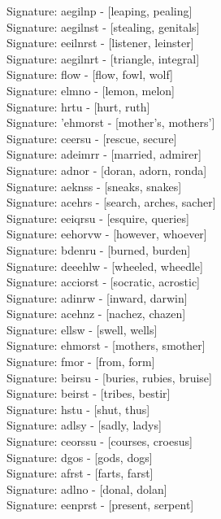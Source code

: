 Signature: {aegilnp} - [leaping, pealing] \\
Signature: {aegilnst} - [stealing, genitals] \\
Signature: {eeilnrst} - [listener, leinster] \\
Signature: {aegilnrt} - [triangle, integral] \\
Signature: {flow} - [flow, fowl, wolf] \\
Signature: {elmno} - [lemon, melon] \\
Signature: {hrtu} - [hurt, ruth] \\
Signature: {'ehmorst} - [mother's, mothers'] \\
Signature: {ceersu} - [rescue, secure] \\
Signature: {adeimrr} - [married, admirer] \\
Signature: {adnor} - [doran, adorn, ronda] \\
Signature: {aeknss} - [sneaks, snakes] \\
Signature: {acehrs} - [search, arches, sacher] \\
Signature: {eeiqrsu} - [esquire, queries] \\
Signature: {eehorvw} - [however, whoever] \\
Signature: {bdenru} - [burned, burden] \\
Signature: {deeehlw} - [wheeled, wheedle] \\
Signature: {acciorst} - [socratic, acrostic] \\
Signature: {adinrw} - [inward, darwin] \\
Signature: {acehnz} - [nachez, chazen] \\
Signature: {ellsw} - [swell, wells] \\
Signature: {ehmorst} - [mothers, smother] \\
Signature: {fmor} - [from, form] \\
Signature: {beirsu} - [buries, rubies, bruise] \\
Signature: {beirst} - [tribes, bestir] \\
Signature: {hstu} - [shut, thus] \\
Signature: {adlsy} - [sadly, ladys] \\
Signature: {ceorssu} - [courses, croesus] \\
Signature: {dgos} - [gods, dogs] \\
Signature: {afrst} - [farts, farst] \\
Signature: {adlno} - [donal, dolan] \\
Signature: {eenprst} - [present, serpent] \\
